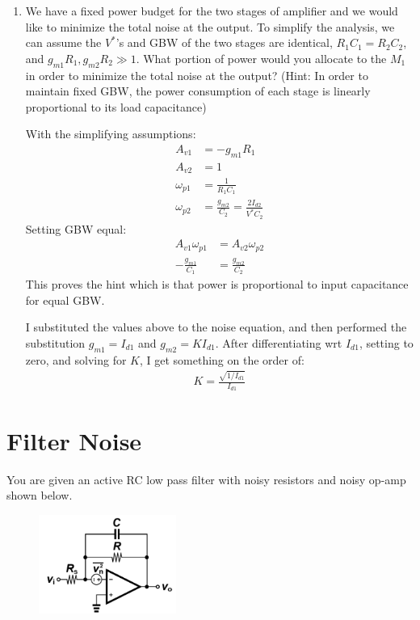 \begin{enumerate}[label=(\alph*)]
  \item {\color{blue}We have a fixed power budget for the two stages of amplifier and we would like to minimize the total noise at the output. To simplify the analysis, we can assume the $V^*$'s and GBW of the two stages are identical, $R_1 C_1 = R_2 C_2$, and $g_{m1}R_1, g_{m2}R_2 \gg 1$. What portion of power would you allocate to the $M_1$ in order to minimize the total noise at the output? (Hint: In order to maintain fixed GBW, the power consumption of each stage is linearly proportional to its load capacitance)}

    With the simplifying assumptions:
    \begin{align*}
      A_{v1} &= -g_{m1} R_1 \\
      A_{v2} &= 1 \\
      \omega_{p1} &= \frac{1}{R_1 C_1} \\
      \omega_{p2} &= \frac{g_{m2}}{C_2} = \frac{2 I_{d2}}{V^* C_2}
    \end{align*}
    Setting GBW equal:
    \begin{align*}
      A_{v1} \omega_{p1} &= A_{v2} \omega_{p2} \\
      -\frac{g_{m1}}{C_1} &= \frac{g_{m2}}{C_2}
    \end{align*}
    This proves the hint which is that power is proportional to input capacitance for equal GBW.

    I substituted the values above to the noise equation, and then performed the substitution $g_{m1} = I_{d1}$ and $g_{m2} = K I_{d1}$. After differentiating wrt $I_{d1}$, setting to zero, and solving for $K$, I get something on the order of:
    \begin{align*}
      K = \frac{\sqrt{1 / I_{d1}}}{I_{d1}}
    \end{align*}
\end{enumerate}

\section{Filter Noise}
{\color{blue}You are given an active RC low pass filter with noisy resistors and noisy op-amp shown below.}

\begin{figure}[H]
  \centering
  \includegraphics[width=0.4\textwidth]{figs/problem3.png}
\end{figure}

